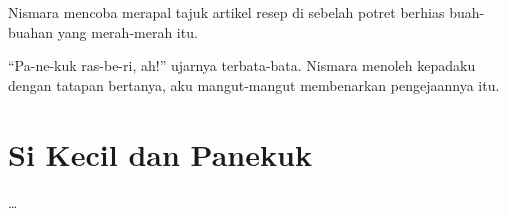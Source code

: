 \documentclass[smalldemyvopaper,11pt,twoside,onecolumn,openright,extrafontsizes]{memoir}
\begin{document}
Nismara mencoba merapal tajuk artikel resep di sebelah potret berhias buah-buahan yang merah-merah itu.

``Pa-ne-kuk ras-be-ri, ah!'' ujarnya terbata-bata. Nismara menoleh kepadaku dengan tatapan bertanya, aku mangut-mangut membenarkan pengejaannya itu.

\chapter{Si Kecil dan Panekuk}

\dots



\end{document}
